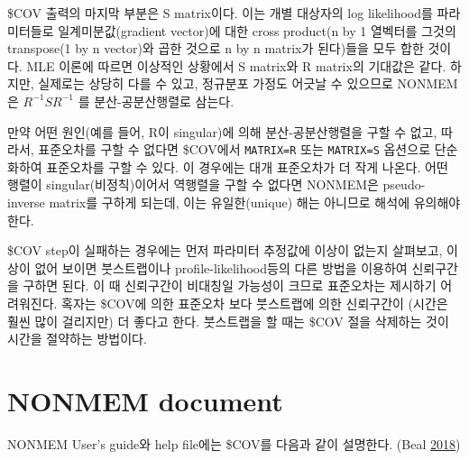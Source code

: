 \documentclass[
  11pt,
  krantz2,
  a4paper]{krantz}
\theoremstyle{definition}
\theoremstyle{definition}
\theoremstyle{definition}
\theoremstyle{remark}
\begin{document}
\$COV 출력의 마지막 부분은 S matrix이다. 이는 개별 대상자의 log likelihood를 파라미터들로 일계미분값(gradient vector)에 대한 cross product(n by 1 열벡터를 그것의 transpose(1 by n vector)와 곱한 것으로 n by n matrix가 된다)들을 모두 합한 것이다. MLE 이론에 따르면 이상적인 상황에서 S matrix와 R matrix의 기대값은 같다. 하지만, 실제로는 상당히 다를 수 있고, 정규분포 가정도 어긋날 수 있으므로 NONMEM은 \(R^{- 1}SR^{- 1}\) 를 분산-공분산행렬로 삼는다.

만약 어떤 원인(예를 들어, R이 singular)에 의해 분산-공분산행렬을 구할 수 없고, 따라서, 표준오차를 구할 수 없다면 \$COV에서 \texttt{MATRIX=R} 또는 \texttt{MATRIX=S} 옵션으로 단순화하여 표준오차를 구할 수 있다. 이 경우에는 대개 표준오차가 더 작게 나온다. 어떤 행렬이 singular(비정칙)이어서 역행렬을 구할 수 없다면 NONMEM은 pseudo-inverse matrix를 구하게 되는데, 이는 유일한(unique) 해는 아니므로 해석에 유의해야 한다.

\$COV step이 실패하는 경우에는 먼저 파라미터 추정값에 이상이 없는지 살펴보고, 이상이 없어 보이면 붓스트랩이나 profile-likelihood등의 다른 방법을 이용하여 신뢰구간을 구하면 된다. 이 때 신뢰구간이 비대칭일 가능성이 크므로 표준오차는 제시하기 어려워진다. 혹자는 \$COV에 의한 표준오차 보다 붓스트랩에 의한 신뢰구간이 (시간은 훨씬 많이 걸리지만) 더 좋다고 한다. 붓스트랩을 할 때는 \$COV 절을 삭제하는 것이 시간을 절약하는 방법이다.

\hypertarget{nonmem-document}{%
\section{NONMEM document}\label{nonmem-document}}

NONMEM User's guide와 help file에는 \$COV를 다음과 같이 설명한다. (Beal \protect\hyperlink{ref-nonmem}{2018})
\end{document}

